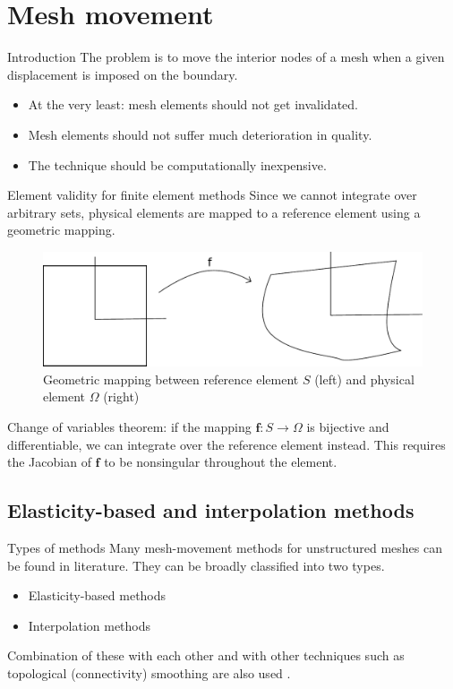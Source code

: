 \documentclass[t,12pt]{beamer}
\let\bld\boldsymbol
\begin{document}
\section{Mesh movement}

\begin{frame}{Introduction}
The problem is to move the interior nodes of a mesh when a given displacement is imposed on the boundary.
\begin{itemize}
	\item At the very least: mesh elements should not get invalidated.
	\item Mesh elements should not suffer much deterioration in quality.
	\item The technique should be computationally inexpensive.
\end{itemize}
\end{frame}

\begin{frame}{Element validity for finite element methods}
Since we cannot integrate over arbitrary sets, physical elements are mapped to a reference element using a geometric mapping.
\begin{figure}
	\includegraphics[scale=0.3]{geommapping}
	\caption{Geometric mapping between reference element $S$ (left) and physical element $\Omega$ (right)}
\end{figure}
Change of variables theorem: if the mapping $\bld{f}:S\rightarrow\Omega$ is bijective and differentiable, we can integrate over the reference element instead. This requires the Jacobian of $\bld{f}$ to be nonsingular throughout the element.
\end{frame}

\subsection{Elasticity-based and interpolation methods}

\begin{frame}{Types of methods}
Many mesh-movement methods for unstructured meshes can be found in literature. They can be broadly classified into two types.
\vspace{0.2in}
\begin{itemize}
	\item Elasticity-based methods
	\item Interpolation methods
\end{itemize}
\vspace{0.2in}
Combination of these with each other and with other techniques such as topological (connectivity) smoothing are also used .
\end{frame}
\end{document}
